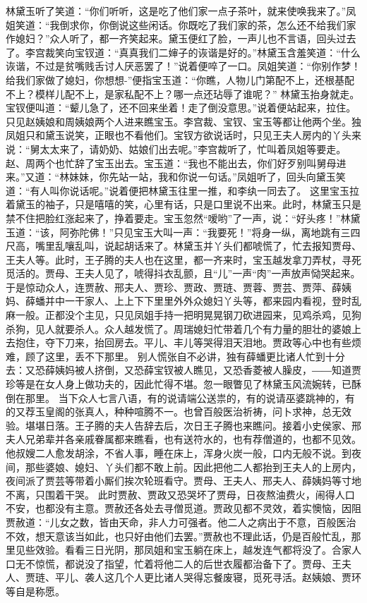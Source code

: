 \documentclass[12pt,oneside]{book}
\begin{document}
林黛玉听了笑道：“你们听听，这是吃了他们家一点子茶叶，就来使唤我来了。”凤姐笑道：“我倒求你，你倒说这些闲话。你既吃了我们家的茶，怎么还不给我们家作媳妇？”众人听了，都一齐笑起来。黛玉便红了脸，一声儿也不言语，回头过去了。李宫裁笑向宝钗道：“真真我们二婶子的诙谐是好的。”林黛玉含羞笑道：“什么诙谐，不过是贫嘴贱舌讨人厌恶罢了！”说着便啐了一口。凤姐笑道：“你别作梦！给我们家做了媳妇，你想想-”便指宝玉道：“你瞧，人物儿门第配不上，还根基配不上？模样儿配不上，是家私配不上？哪一点还玷辱了谁呢？”
林黛玉抬身就走。宝钗便叫道：“颦儿急了，还不回来坐着！走了倒没意思。”说着便站起来，拉住。只见赵姨娘和周姨娘两个人进来瞧宝玉。李宫裁、宝钗、宝玉等都让他两个坐。独凤姐只和黛玉说笑，正眼也不看他们。宝钗方欲说话时，只见王夫人房内的丫头来说：“舅太太来了，请奶奶、姑娘们出去呢。”李宫裁听了，忙叫着凤姐等要走。赵、周两个也忙辞了宝玉出去。宝玉道：“我也不能出去，你们好歹别叫舅母进来。”又道：“林妹妹，你先站一站，我和你说一句话。”凤姐听了，回头向黛玉笑道：“有人叫你说话呢。”说着便把林黛玉往里一推，和李纨一同去了。
这里宝玉拉着黛玉的袖子，只是嘻嘻的笑，心里有话，只是口里说不出来。此时，林黛玉只是禁不住把脸红涨起来了，挣着要走。宝玉忽然“嗳哟”了一声，说：“好头疼！”林黛玉道：“该，阿弥陀佛！”只见宝玉大叫一声：“我要死！”将身一纵，离地跳有三四尺高，嘴里乱嚷乱叫，说起胡话来了。林黛玉并丫头们都唬慌了，忙去报知贾母、王夫人等。此时，王子腾的夫人也在这里，都一齐来时，宝玉越发拿刀弄杖，寻死觅活的。贾母、王夫人见了，唬得抖衣乱颤，且“儿”一声“肉”一声放声恸哭起来。于是惊动众人，连贾赦、邢夫人、贾珍、贾政、贾琏、贾蓉、贾芸、贾萍、薛姨妈、薛蟠并中一干家人、上上下下里里外外众媳妇丫头等，都来园内看视，登时乱麻一般。正都没个主见，只见凤姐手持一把明晃晃钢刀砍进园来，见鸡杀鸡，见狗杀狗，见人就要杀人。众人越发慌了。周瑞媳妇忙带着几个有力量的胆壮的婆娘上去抱住，夺下刀来，抬回房去。平儿、丰儿等哭得泪天泪地。贾政等心中也有些烦难，顾了这里，丢不下那里。
别人慌张自不必讲，独有薛蟠更比诸人忙到十分去：又恐薛姨妈被人挤倒，又恐薛宝钗被人瞧见，又恐香菱被人臊皮，――知道贾珍等是在女人身上做功夫的，因此忙得不堪。忽一眼瞥见了林黛玉风流婉转，已酥倒在那里。
当下众人七言八语，有的说请端公送祟的，有的说请巫婆跳神的，有的又荐玉皇阁的张真人，种种喧腾不一。也曾百般医治祈祷，问卜求神，总无效验。堪堪日落。王子腾的夫人告辞去后，次日王子腾也来瞧问。接着小史侯家、邢夫人兄弟辈并各亲戚眷属都来瞧看，也有送符水的，也有荐僧道的，也都不见效。他叔嫂二人愈发胡涂，不省人事，睡在床上，浑身火炭一般，口内无般不说。到夜间，那些婆娘、媳妇、丫头们都不敢上前。因此把他二人都抬到王夫人的上房内，夜间派了贾芸等带着小厮们挨次轮班看守。贾母、王夫人、邢夫人、薛姨妈等寸地不离，只围着干哭。
此时贾赦、贾政又恐哭坏了贾母，日夜熬油费火，闹得人口不安，也都没有主意。贾赦还各处去寻僧觅道。贾政见都不灵效，着实懊恼，因阻贾赦道：“儿女之数，皆由天命，非人力可强者。他二人之病出于不意，百般医治不效，想天意该当如此，也只好由他们去罢。”贾赦也不理此话，仍是百般忙乱，那里见些效验。看看三日光阴，那凤姐和宝玉躺在床上，越发连气都将没了。合家人口无不惊慌，都说没了指望，忙着将他二人的后世衣履都治备下了。贾母、王夫人、贾琏、平儿、袭人这几个人更比诸人哭得忘餐废寝，觅死寻活。赵姨娘、贾环等自是称愿。
\end{document}
